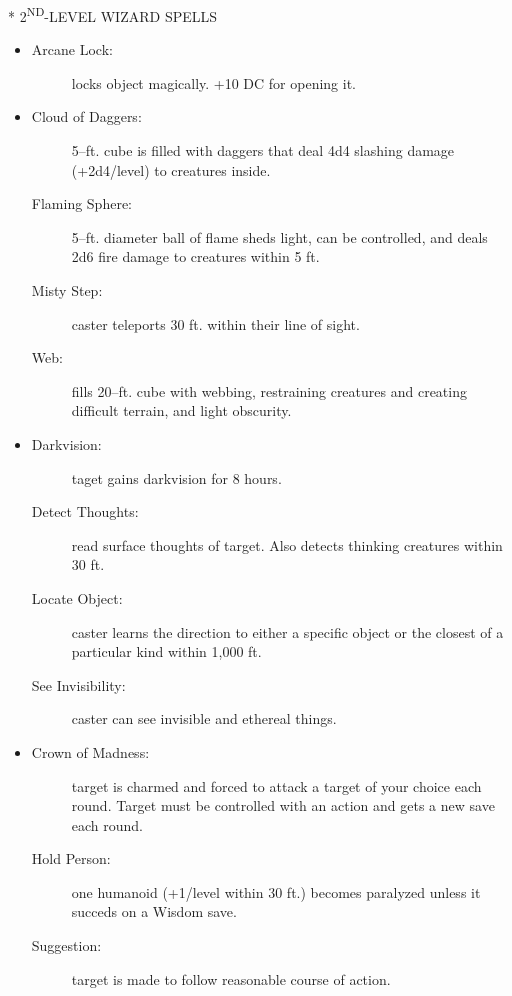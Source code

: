 \documentclass[DIV=14, paper=a4, fontsize=10pt, twocolumn, twoside]{scrartcl}
\makeatletter
\let\origsection\section
\renewcommand\section{\@ifstar{\starsection}{\nostarsection}}
\newcommand\nostarsection[1]
{\origsection{#1}\vspace{-0.5em}}
\newcommand\starsection[1]
{\vspace{-0.5cm}\origsection*{#1}\vspace{-0.3cm}}
\newcommand\invisiblesection[1]{%
  \refstepcounter{section}%
  \sectionmark{#1}
}
\newcommand\listsection[2]{%
	\invisiblesection{#2}
	\section*{\color{dndblue} #1}
}
\renewcommand\thesection{}
\makeatother
\begin{document}
\listsection{\color{dndblue}2\textsuperscript{ND}-LEVEL WIZARD SPELLS}{LEVEL 2}

\begin{itemize}[align=parleft,labelwidth=1cm]
	\renewcommand{\labelitemi}{Abjur}\item
	\begin{description}
 \item[Arcane Lock:] locks object magically. +10 DC for opening it.
\end{description}
\renewcommand{\labelitemi}{Conj}\item
\begin{description}
 \item[Cloud of Daggers:] 5–ft. cube is filled with daggers that deal 4d4 slashing damage (+2d4/level) to creatures inside.
 \item[Flaming Sphere:] 5–ft. diameter ball of flame sheds light, can be controlled, and deals 2d6 fire damage to creatures within 5 ft.
 \item[Misty Step:] caster teleports 30 ft. within their line of sight.
 \item[Web:] fills 20–ft. cube with webbing, restraining creatures and creating difficult terrain, and light obscurity.
\end{description}
\renewcommand{\labelitemi}{Div}\item
\begin{description}
 \item[Darkvision:] taget gains darkvision for 8 hours.
 \item[Detect Thoughts:] read surface thoughts of target. Also detects thinking creatures within 30 ft.
 \item[Locate Object:] caster learns the direction to either a specific object or the closest of a particular kind within 1,000 ft.
 \item[See Invisibility:] caster can see invisible and ethereal things.
\end{description}
\renewcommand{\labelitemi}{Ench}\item
\begin{description}
 \item[Crown of Madness:] target is charmed and forced to attack a target of your choice each round. Target must be controlled with an action and gets a new save each round.
 \item[Hold Person:] one humanoid (+1/level within 30 ft.) becomes paralyzed unless it succeds on a Wisdom save.
 \item[Suggestion:] target is made to follow reasonable course of action.

\end{description}
\end{itemize}
\end{document}
